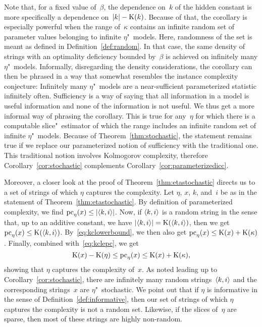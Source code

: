 Note that, for a fixed value of~$\beta$, the dependence on~$k$ of the hidden constant is more specifically a dependence on~${\lvert k\rvert} - \operatorname{K}(k)$.
Because of that, the corollary is especially powerful when the range of~$\kappa$ contains an infinite random set of parameter values belonging to infinite $\eta$"~models.
Here, randomness of the set is meant as defined in Definition~\ref{def:random}.
In that case, the same density of strings with an optimality deficiency bounded by~$\beta$ is achieved on infinitely many $\eta$"~models.
Informally, disregarding the density considerations, the corollary can then be phrased in a way that somewhat resembles the instance complexity conjecture:
Infinitely many $\eta$"~models are a near-sufficient parameterized statistic infinitely often.
Sufficiency is a way of saying that all information in a model is useful information and none of the information is not useful.
We thus get a more informal way of phrasing the corollary.
This is true for any~$\eta$ for which there is a computable slice"~estimator of which the range includes an infinite random set of infinite $\eta$"~models.
Because of Theorem~\ref{thm:stochastic}, the statement remains true if we replace our parameterized notion of sufficiency with the traditional one.
This traditional notion involves Kolmogorov complexity, therefore Corollary~\ref{cor:stochastic} complements Corollary~\ref{cor:parameterizedicc}.

Moreover, a closer look at the proof of Theorem~\ref{thm:etastochastic} directs us to a set of strings of which $\eta$ captures the complexity.
Let $\eta$, $x$, $k$, and~$i$ be as in the statement of Theorem~\ref{thm:etastochastic}.
By definition of parameterized complexity, we find $\operatorname{pc}_\eta(x) \le {\lvert{\langle k, i\rangle}\rvert}$.
Now, if ${\langle k, i\rangle}$ is a random string in the sense that, up to an additive constant, we have ${\lvert{\langle k, i\rangle}\rvert} = \operatorname{K}({\langle k, i\rangle})$, then we get $\operatorname{pc}_\eta(x) \le \operatorname{K}({\langle k, i\rangle})$.
By~\eqref{eq:kclowerbound}, we then also get $\operatorname{pc}_\eta(x) \le \operatorname{K}(x) + \operatorname{K}(\kappa)$.
Finally, combined with~\eqref{eq:kclepc}, we get
\begin{equation*}
  \operatorname{K}(x) - \operatorname{K}(\eta) \le \operatorname{pc}_\eta(x) \le \operatorname{K}(x) + \operatorname{K}(\kappa),
\end{equation*}
showing that $\eta$ captures the complexity of~$x$.
As noted leading up to Corollary~\ref{cor:stochastic}, there are infinitely many random strings~${\langle k, i\rangle}$ and the corresponding strings~$x$ are $\eta$"~stochastic.
We point out that if $\eta$ is informative in the sense of Definition~\ref{def:informative}, then our set of strings of which $\eta$ captures the complexity is not a random set.
Likewise, if the slices of~$\eta$ are sparse, then most of these strings are highly non-random.

